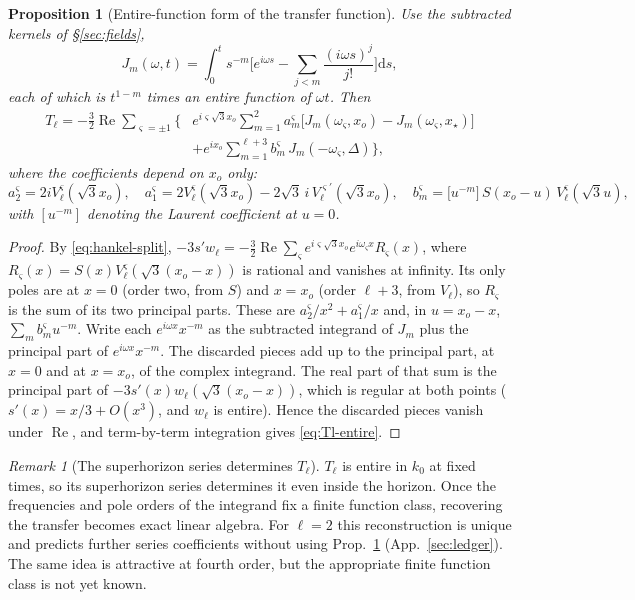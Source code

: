 \documentclass[11pt]{article}
\newtheorem{proposition}[theorem]{Proposition}
\theoremstyle{definition}
\theoremstyle{remark}
\newtheorem{remark}[theorem]{Remark}
\newcommand{\dd}{\mathrm{d}}
\begin{document}
\begin{proposition}[Entire-function form of the transfer function]\label{prop:Tl}
Use the subtracted kernels of \S\ref{sec:fields},
\[
J_m(\omega,t)=\int_0^ts^{-m}\Big[e^{i\omega s}-\sum_{j<m}\frac{(i\omega s)^j}{j!}\Big]\dd s ,
\]
each of which is $t^{1-m}$ times an entire function of $\omega t$. Then
\begin{equation}\label{eq:Tl-entire}
\boxed{\begin{aligned}
T_\ell=-\frac32\operatorname{Re}\sum_{\varsigma=\pm1}\Big\{&
e^{i\varsigma\sqrt3x_o}\sum_{m=1}^{2}a^\varsigma_m\big[J_m(\omega_\varsigma,x_o)-J_m(\omega_\varsigma,x_\star)\big]\\
&+e^{ix_o}\sum_{m=1}^{\ell+3}b^\varsigma_m\,J_m(-\omega_\varsigma,\Delta)\Big\},
\end{aligned}}
\end{equation}
where the coefficients depend on $x_o$ only:
\[
a^\varsigma_2=2iV^\varsigma_\ell(\sqrt3x_o),\quad
a^\varsigma_1=2V^\varsigma_\ell(\sqrt3x_o)-2\sqrt3\,i\,V^{\varsigma\prime}_\ell(\sqrt3x_o),\quad
b^\varsigma_m=\big[u^{-m}\big]\,S(x_o-u)\,V^\varsigma_\ell(\sqrt3u),
\]
with $[u^{-m}]$ denoting the Laurent coefficient at $u=0$.
\end{proposition}
\begin{proof}
By \eqref{eq:hankel-split}, $-3s'w_\ell=-\frac32\operatorname{Re}\sum_\varsigma
e^{i\varsigma\sqrt3x_o}e^{i\omega_\varsigma x}R_\varsigma(x)$, where
$R_\varsigma(x)=S(x)V^\varsigma_\ell(\sqrt3(x_o-x))$ is rational and vanishes at infinity. Its only
poles are at $x=0$ (order two, from $S$) and $x=x_o$ (order $\ell+3$, from $V_\ell$), so
$R_\varsigma$ is the sum of its two principal parts. These are $a^\varsigma_2/x^2+a^\varsigma_1/x$ and, in
$u=x_o-x$, $\sum_mb^\varsigma_mu^{-m}$. Write each $e^{i\omega x}x^{-m}$ as the subtracted
integrand of $J_m$ plus the principal part of $e^{i\omega x}x^{-m}$. The discarded pieces add up
to the principal part, at $x=0$ and at $x=x_o$, of the complex integrand. The real part of that
sum is the principal part of $-3s'(x)w_\ell(\sqrt3(x_o-x))$, which is regular at both points
($s'(x)=x/3+O(x^3)$, and $w_\ell$ is entire). Hence the discarded pieces vanish under
$\operatorname{Re}$, and term-by-term integration gives \eqref{eq:Tl-entire}.
\end{proof}

\begin{remark}[The superhorizon series determines $T_\ell$]\label{rem:reconstruct}
$T_\ell$ is entire in $k_0$ at fixed times, so its superhorizon series determines it even
inside the horizon. Once the frequencies and pole orders of the integrand fix a finite
function class, recovering the transfer becomes exact linear algebra. For $\ell=2$ this
reconstruction is unique and predicts further series coefficients without using
Prop.~\ref{prop:Tl} (App.~\ref{sec:ledger}). The same idea is attractive at fourth order,
but the appropriate finite function class is not yet known.
\end{remark}
\end{document}
